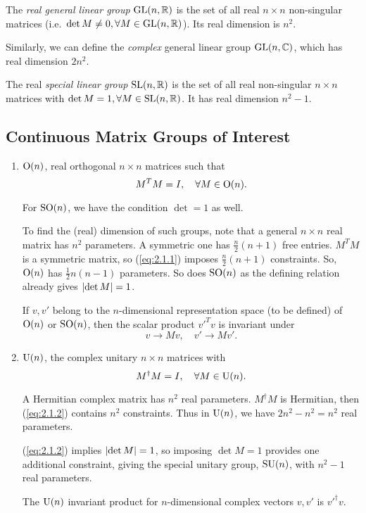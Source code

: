 \documentclass[a4paper,11pt]{article}
\begin{document}
	\begin{defi}
		The \emph{real general linear group} $\operatorname{GL}(n,\mathbb{R})$ is the set of all real $n \times n$ non-singular matrices (i.e.\ $\det M \neq 0, \forall M \in \operatorname{GL}(n,\mathbb{R})$). Its real dimension is $n^2$.

		Similarly, we can define the \emph{complex} general linear group $\operatorname{GL} (n,\mathbb{C})$, which has real dimension $2 n^2$.
	\end{defi}

	\begin{defi}
		The real \emph{special linear group} $\operatorname{SL}(n,\mathbb{R})$ is the set of all real non-singular $n \times n$ matrices with $\det M = 1, \forall M \in \operatorname{SL}(n,\mathbb{R})$. It has real dimension $n^2 - 1$.
	\end{defi}

	\subsection{Continuous Matrix Groups of Interest}

	\begin{enumerate}
		\item $\operatorname{O}(n)$, real orthogonal $n\times n$ matrices such that \begin{equation}
			M^T M = I, \quad \forall M \in \operatorname{O}(n).
			\label{eq:2.1.1}
		\end{equation}
		
		For $\operatorname{SO}(n)$, we have the condition $\det = 1$ as well.

		To find the (real) dimension of such groups, note that a general $n \times n$ real matrix has $n^2$ parameters. A symmetric one has $\frac{n}{2} (n+1)$ free entries. $M^T M$ is a symmetric matrix, so (\ref{eq:2.1.1}) imposes $\frac{n}{2}(n+1)$ constraints. So, $\operatorname{O}(n)$ has $\frac{1}{2} n (n-1)$ parameters. So does $\operatorname{SO}(n)$ as the defining relation already gives $\abs{\det M}=1$.
		
		If $v,v'$ belong to the $n$-dimensional representation space (to be defined) of $\operatorname{O}(n)$ or $\operatorname{SO}(n)$, then the scalar product $v'^T v$ is invariant under
		\[
			v \to Mv, \quad v' \to Mv'.
		\]
		\item $\operatorname{U}(n)$, the complex unitary $n\times n$ matrices with \begin{equation}
			M^\dagger M = I, \quad \forall M \in \operatorname{U}(n).
			\label{eq:2.1.2}
		\end{equation} 

		A Hermitian complex matrix has $n^2$ real parameters. $M^\dagger M$ is Hermitian, then (\ref{eq:2.1.2}) contains $n^2$ constraints. Thus in $\operatorname{U}(n)$, we have $2n^2 - n^2 = n^2$ real parameters. 
		
		(\ref{eq:2.1.2}) implies $\abs{\det M} = 1$, so imposing $\det M = 1$ provides one additional constraint, giving the special unitary group, $\operatorname{SU}(n)$, with $n^2 - 1$ real parameters.

		The $\operatorname{U}(n)$ invariant product for $n$-dimensional complex vectors $v,v'$ is $v'^\dagger v$.
	\end{enumerate}
\end{document}

